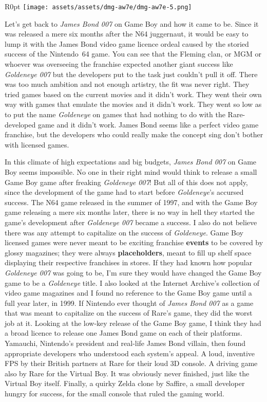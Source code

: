 \documentclass{book}
\begin{document}
\begin{wrapfigure}{R}{0pt} \texttt{[image: assets/assets/dmg-aw7e/dmg-aw7e-5.png]}\end{wrapfigure}
Let’s get back to \emph{James Bond 007} on Game Boy and how it came to be. Since it was released a mere six months after the N64 juggernaut, it would be easy to lump it with the James Bond video game licence ordeal caused by the storied success of the Nintendo 64 game. You can see that the Fleming clan, or MGM or whoever was overseeing the franchise expected another giant success like \emph{Goldeneye 007} but the developers put to the task just couldn’t pull it off. There was too much ambition and not enough artistry, the fit was never right. They tried games based on the current movies and it didn’t work. They went their own way with games that emulate the movies and it didn’t work. They went so low as to put the name \emph{Goldeneye} on games that had nothing to do with the Rare-developed game and it didn’t work. James Bond seems like a perfect video game franchise, but the developers who could really make the concept sing don’t bother with licensed games.

In this climate of high expectations and big budgets, \emph{James Bond 007} on Game Boy seems impossible. No one in their right mind would think to release a small Game Boy game after freaking \emph{Goldeneye 007}! But all of this does not apply, since the development of the game had to start before \emph{Goldeneye}’s accursed success. The N64 game released in the summer of 1997, and with the Game Boy game releasing a mere six months later, there is no way in hell they started the game’s development after \emph{Goldeneye 007} became a success. I also do not believe there was any attempt to capitalize on the success of \emph{Goldeneye}. Game Boy licensed games were never meant to be exciting franchise \textbf{events} to be covered by glossy magazines; they were always \textbf{placeholders}, meant to fill up shelf space displaying their respective franchises in stores. If they had known how popular \emph{Goldeneye 007} was going to be, I’m sure they would have changed the Game Boy game to be a \emph{Goldeneye} title. I also looked at the Internet Archive’s collection of video game magazines and I found no reference to the Game Boy game until a full year later, in 1999. If Nintendo ever thought of \emph{James Bond 007} as a game that was meant to capitalize on the success of Rare’s game, they did the worst job at it. Looking at the low-key release of the Game Boy game, I think they had a broad licence to release one James Bond game on each of their platforms. Yamauchi, Nintendo’s president and real-life James Bond villain, then found appropriate developers who understood each system’s appeal. A loud, inventive FPS by their British partners at Rare for their loud 3D console. A driving game also by Rare for the Virtual Boy. It was obviously never finished, just like the Virtual Boy itself. Finally, a quirky Zelda clone by Saffire, a small developer hungry for success, for the small console that ruled the gaming world.
\end{document}
